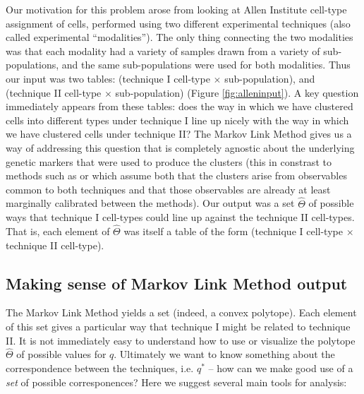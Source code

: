 Our motivation for this problem arose from looking at Allen Institute cell-type assignment of cells, performed using two different experimental techniques (also called experimental ``modalities'').  The only thing connecting the two modalities was that each modality had a variety of samples drawn from a variety of sub-populations, and the same sub-populations were used for both modalities.  Thus our input was two tables: (technique I cell-type $\times$ sub-population), and (technique II cell-type $\times$ sub-population) (Figure \ref{fig:alleninput}).  A key question immediately appears from these tables: does the way in which we have clustered cells into different types under technique I line up nicely with the way in which we have clustered cells under technique II?  The Markov Link Method gives us a way of addressing this question that is completely agnostic about the underlying genetic markers that were used to produce the clusters (this in constrast to methods such as \cite{kiselev2018scmap} or \cite{crow2018characterizing} which assume both that the clusters arise from observables common to both techniques and that those observables are already at least marginally calibrated between the methods).   Our output was a set $\hat \Theta$ of possible ways that technique I cell-types could line up against the technique II cell-types.  That is, each element of $\hat \Theta$ was itself a table of the form (technique I cell-type $\times$ technique II cell-type).

\subsection{Making sense of Markov Link Method output}

The Markov Link Method yields a set (indeed, a convex polytope).  Each element of this set gives a particular way that technique I might be related to technique II.  It is not immediately easy to understand how to use or visualize the polytope $\hat \Theta$ of possible values for $q$.  Ultimately we want to know something about the correspondence between the techniques, i.e. $q^*$ -- how can we make good use of a \emph{set} of possible corresponences?  Here we suggest several main tools for analysis:

